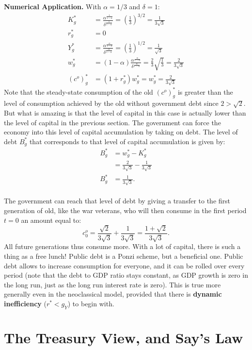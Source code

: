 \documentclass[]{book}
\theoremstyle{definition}
\theoremstyle{definition}
\theoremstyle{definition}
\theoremstyle{remark}
\begin{document}
\textbf{Numerical Application.} With \(\alpha = 1/3\) and
\(\delta = 1\): \[
\begin{aligned}
K^{*}_g&=\frac{\alpha^{\frac{1}{1-\alpha}}}{\delta^{\frac{1}{1-\alpha}}}=\left(\frac{1}{3}\right)^{3/2} = \frac{1}{3\sqrt{3}}\\
r_g^{*}&=0\\
Y_g^{*}&=\frac{\alpha^{\frac{\alpha}{1-\alpha}}}{\delta^{\frac{\alpha}{1-\alpha}}} = \left(\frac{1}{3}\right)^{1/2}=\frac{1}{\sqrt{3}}\\
w^{*}_g&=(1-\alpha) \frac{\alpha^{\frac{\alpha}{1-\alpha}}}{\delta^{\frac{\alpha}{1-\alpha}}}= \frac{2}{3}\sqrt{\frac{1}{3}} = \frac{2}{3\sqrt{3}}\\
(c^{o})^{*}_g&=(1+r^*_g)w^{*}_g=w^{*}_g = \frac{2}{3\sqrt{3}}
\end{aligned}
\] Note that the steady-state consumption of the old \((c^{o})^{*}_g\)
is greater than the level of consumption achieved by the old without
government debt since \(2>\sqrt{2}\). But what is amazing is that the
level of capital in this case is actually lower than the level of
capital in the previous section. The government can force the economy
into this level of capital accumulation by taking on debt. The level of
debt \(B^{*}_g\) that corresponds to that level of capital accumulation
is given by: \[
\begin{aligned}
B^{*}_g&=w^{*}_g-K^{*}_g\\
&=\frac{2}{3\sqrt{3}}-\frac{1}{3\sqrt{3}}\\
B^{*}_g&=\frac{1}{3\sqrt{3}}.
\end{aligned}
\]\\
The government can reach that level of debt by giving a transfer to the
first generation of old, like the war veterans, who will then consume in
the first period \(t=0\) an amount equal to:
\[c_{0}^{o}=\frac{\sqrt{2}}{3\sqrt{3}}+\frac{1}{3\sqrt{3}}=\frac{1+\sqrt{2}}{3\sqrt{3}}.\]
All future generations thus consume more. With a lot of capital, there
is such a thing as a free lunch! Public debt is a Ponzi scheme, but a
beneficial one. Public debt allows to increase consumption for everyone,
and it can be rolled over every period (note that the debt to GDP ratio
stays constant, as GDP growth is zero in the long run, just as the long
run interest rate is zero). This is true more generally even in the
neoclassical model, provided that there is \textbf{dynamic inefficiency}
(\(r^*<g_Y\)) to begin with.

\section{The Treasury View, and Say's
Law}\label{the-treasury-view-and-says-law}
\end{document}
